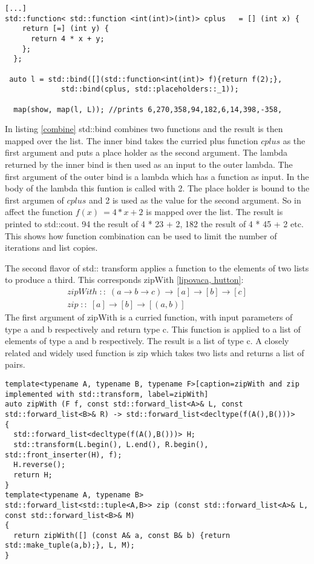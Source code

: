 \documentclass[12pt,fleqn]{article}
\begin{document}
 \begin{lstlisting}[caption=using std;:bind to combine functions, label=combine ]
[...]
std::function< std::function <int(int)>(int)> cplus   = [] (int x) {
    return [=] (int y) {
      return 4 * x + y;
    };
  };

 auto l = std::bind([](std::function<int(int)> f){return f(2);},
		     std::bind(cplus, std::placeholders::_1));

  map(show, map(l, L)); //prints 6,270,358,94,182,6,14,398,-358,

\end{lstlisting}
In listing \ref{combine} std::bind combines two functions and the result is then mapped over the list.
The inner bind takes the curried plus function $cplus$ as the first argument and puts a place holder as the second argument.
The lambda returned by the inner bind is then used as an input to the outer lambda. 
The first argument of the outer bind is a lambda which has a function as input.
In the body of the lambda this funtion is called with 2.
The place holder is bound to the first argumen of $cplus$ and 2 is used as the value for the second argument.
So in affect the function $f(x)\ = 4 * x + 2$ is mapped over the list.
The result is printed to std::cout. 94 the result of 4 * 23 + 2, 182 the result of 4 * 45 + 2 etc.
This shows how function combination can be used to limit the number of iterations and list copies.

The second flavor of std:: transform applies a function to the elements of two lists to produce a third. 
This corresponds zipWith \ref{lipovaca, hutton}:
\begin{eqnarray*}
zipWith \;::\; (a \rightarrow b \rightarrow c ) \rightarrow [a] \rightarrow [b] \rightarrow [c] \\
zip \;::\;  [a] \rightarrow [b] \rightarrow [(a,b)]
\end{eqnarray*}
The first argument of zipWith is a curried function, with input parameters of type a and b respectively and return type c. 
This function is applied to a list of elements of type a and b respectively.
The result is a list of type c.
A closely related and widely used function is zip \cite{zip} which takes two lists and returns a list of pairs.

\begin{lstlisting}
template<typename A, typename B, typename F>[caption=zipWith and zip implemented with std::transform, label=zipWith]
auto zipWith (F f, const std::forward_list<A>& L, const std::forward_list<B>& R) -> std::forward_list<decltype(f(A(),B()))>
{
  std::forward_list<decltype(f(A(),B()))> H;
  std::transform(L.begin(), L.end(), R.begin(), std::front_inserter(H), f);
  H.reverse();
  return H;
}
template<typename A, typename B>
std::forward_list<std::tuple<A,B>> zip (const std::forward_list<A>& L, const std::forward_list<B>& M) 
{
  return zipWith([] (const A& a, const B& b) {return std::make_tuple(a,b);}, L, M);
}

\end{lstlisting}
\end{document}
